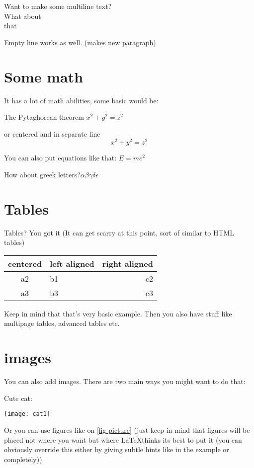 Want to make some multiline text?\\What about \\ that

Empty line works as well. (makes new paragraph)

\section{Some math}
\label{section-math}
It has a lot of math abilities, some basic would be:

The Pytaghorean theorem \(x^2 + y^2 = z^2\)

or centered and in separate line \[ x^2 + y^2 = z^2 \]

You can also put equations like that: $E=mc^2$

How about greek letters?$\alpha \beta \gamma \delta \epsilon$

\section{Tables}
Tables? You got it (It can get scarry at this point, sort of similar to HTML tables)

\begin{center}
  \begin{tabular}{ c | l r }
   centered & left aligned & right aligned \\ \hline
   a2 & b1 & c2 \\  
   a3 & b3 & c3    
  \end{tabular}
  \end{center}
  
  Keep in mind that that's very basic example. Then you also have stuff like multipage tables, advanced tables etc.

\newpage
\section{images}
You can also add images. There are two main ways you might want to do that:

Cute cat:

\begin{center}
  \texttt{[image: cat1]}
\end{center}

Or you can use figures like on \autoref{fig-picture} (just keep in mind that figures will be placed not where you want but where \LaTeX\space thinks its best to put it (you can obviously override this either by giving subtle hints like in the example or completely))

